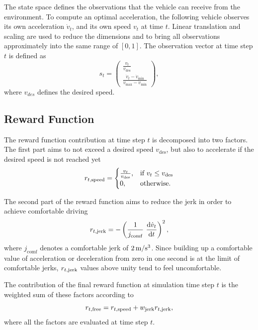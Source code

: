 \documentclass[review]{elsarticle}
\providecommand{\sub}[1]{_{\mathrm{#1}}}  %
\providecommand{\3}{{\ss}}
\begin{document}
	The state space defines the observations that the vehicle can receive from the environment. To compute an optimal
	acceleration, the following vehicle observes its own acceleration $\dot{v}_t$,
	and its own speed $v_t$ at time $t$. Linear translation and scaling are used to
	reduce the dimensions and to bring all observations approximately into
	the same range of $[0,1]$. The observation vector at time step $t$ is defined
	as 	
	\begin{equation}
		\label{eq:stateFree}
		s_t = \begin{pmatrix} \frac{v_t}{v\sub{des}} \\ \frac{\dot{v}_t-\dot{v}\sub{min}}{\dot{v}\sub{max} - \dot{v}\sub{min}}\end{pmatrix},
	\end{equation}
	where $v_{des}$ defines the desired speed.
	\subsection{Reward Function}
	\label{rewardFunctionFree}
	The reward function contribution at time step $t$ is decomposed into two factors. The first part aims to
	not exceed a desired speed $v\sub{des}$, but also to accelerate if the
	desired speed is not reached yet  
	\begin{equation}
		\label{eq:r1Free}
		r_{t, \rm speed}  = 
		\begin{cases}
			\frac{v_t}{v\sub{des}},
			& \text{if } v_t \leq v\sub{des}\\
			0,
			& \text{otherwise}.
		\end{cases}
	\end{equation}
	
	The second part of the reward function aims to reduce the jerk in
	order to achieve comfortable driving 
	\begin{equation}
		\label{eq:r2Free}
		r_{t, \rm jerk} = -\left(\frac{1}{j\sub{comf}} \ \dv{\dot{v}_t}{t}\right)^2,
	\end{equation}
	where $j\sub{comf}$ denotes a comfortable jerk of $\unit[2]{m/s^3}$.
	Since building up a comfortable value of acceleration or deceleration
	from zero in one second is at the limit of comfortable jerks, $r_{t, \rm jerk} $
	values above unity tend to feel uncomfortable.
	
	The contribution of the final reward function at simulation time step $t$ is the weighted
	sum of these factors according to
	\begin{equation}
		\label{rt1}
		r_{t, \rm free} =r_{t, \rm speed} + w\sub{jerk} r_{t, \rm jerk} ,
	\end{equation}
	where all the factors are evaluated at time step $t$. 
	
\end{document}
